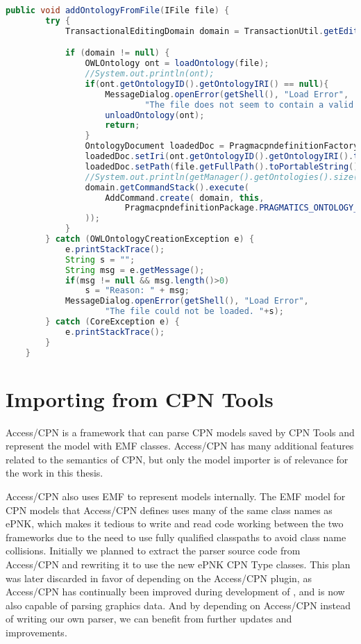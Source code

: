 \begin{lstlisting}[language=Java,float,label=lst:addOntologyFromFile,
caption=addOntologyFromFile()]
	public void addOntologyFromFile(IFile file) {
		try {
			TransactionalEditingDomain domain = TransactionUtil.getEditingDomain(this);

			if (domain != null) {
				OWLOntology ont = loadOntology(file);
				//System.out.println(ont);
				if(ont.getOntologyID().getOntologyIRI() == null){
					MessageDialog.openError(getShell(), "Load Error", 
							"The file does not seem to contain a valid ontology.");
					unloadOntology(ont);
					return;
				}
				OntologyDocument loadedDoc = PragmacpndefinitionFactory.eINSTANCE.createOntologyDocument();
				loadedDoc.setIri(ont.getOntologyID().getOntologyIRI().toString());
				loadedDoc.setPath(file.getFullPath().toPortableString());
				//System.out.println(getManager().getOntologies().size());
				domain.getCommandStack().execute(
					AddCommand.create( domain, this, 
						PragmacpndefinitionPackage.PRAGMATICS_ONTOLOGY__DOCUMENTS, loadedDoc
				));
			}
		} catch (OWLOntologyCreationException e) {
			e.printStackTrace();
			String s = "";
			String msg = e.getMessage();
			if(msg != null && msg.length()>0)
				s = "Reason: " + msg;
			MessageDialog.openError(getShell(), "Load Error", 
					"The file could not be loaded. "+s);
		} catch (CoreException e) {
			e.printStackTrace();
		}
	}
\end{lstlisting}


\section{Importing from CPN Tools}\label{sec:import_wizard}
Access/CPN is a framework that can parse CPN models saved by CPN Tools and
represent the model with EMF classes. Access/CPN has many additional features
related to the semantics of CPN, but only the model importer is of relevance for
the work in this thesis.

Access/CPN also uses EMF to represent models internally. The EMF model for CPN
models that Access/CPN defines uses many of the same class names as ePNK, which
makes it tedious to write and read code working between the two frameworks due
to the need to use fully qualified classpaths to avoid class name collisions.
Initially we planned to extract the parser source code from Access/CPN and
rewriting it to use the new ePNK CPN Type classes. This plan was later discarded
in favor of depending on the Access/CPN plugin, as Access/CPN has continually
been improved during development of \thename{}, and is now also capable of
parsing graphics data. And by depending on Access/CPN instead of writing our own
parser, we can benefit from further updates and improvements.

